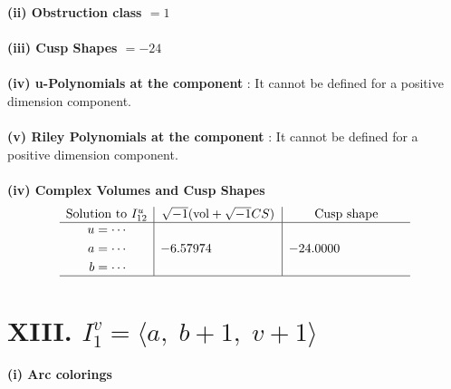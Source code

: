 \documentclass[1p]{elsarticle_modified}
\theoremstyle{definition}
\newcommand{\I}{\sqrt{-1}}
\begin{document}
\flushleft \textbf{(ii) Obstruction class $= 1$}\\~\\
\flushleft \textbf{(iii) Cusp Shapes $= -24$}\\~\\
\flushleft \textbf{(iv) u-Polynomials at the component} : It cannot be defined for a positive dimension component.\\~\\
\flushleft \textbf{(v) Riley Polynomials at the component} : It cannot be defined for a positive dimension component.\\~\\
\newpage\flushleft \textbf{(iv) Complex Volumes and Cusp Shapes}
$$\begin{array}{c|c|c} 
\text{Solution to }I^u_{12}& \I (\text{vol} + \sqrt{-1}CS) & \text{Cusp shape}\\
 \hline 
\begin{aligned}
u &= \cdots \\
a &= \cdots \\
b &= \cdots\end{aligned}
 & -6.57974\phantom{ +0.000000I} & -24.0000\phantom{ +0.000000I}\\
 \hline 
 \end{array}
$$\newpage\renewcommand{\arraystretch}{1}
\centering \section*{XIII. $I^v_{1}= \langle a,\;b+1,\;v+1 \rangle$}
\flushleft \textbf{(i) Arc colorings}\\
\end{document}
